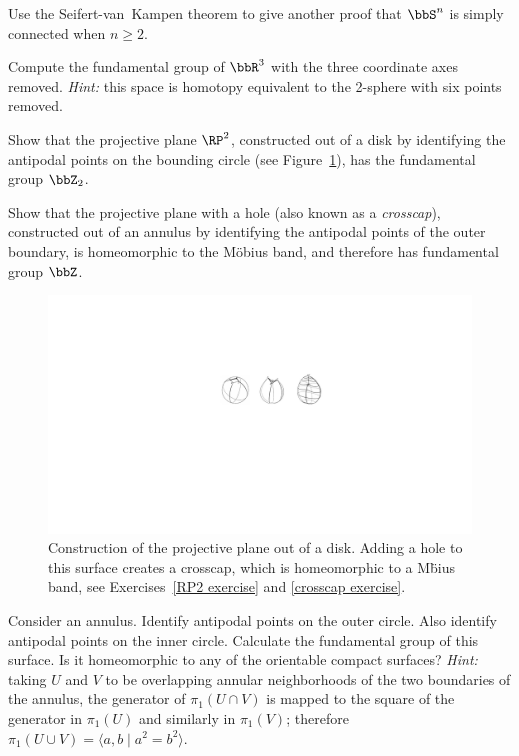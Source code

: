 \begin{xca}{{{\cite[Exercise 10-1]{LeeTop}}}}
    Use the Seifert-van~Kampen theorem to give another proof that $\bbS^n$ is simply connected when $n \geq 2$.
\end{xca}
\begin{xca}{{{\cite[Excercise 10-5]{LeeTop}}}}
    Compute the fundamental group of $\bbR^3$ with the three coordinate axes removed. \emph{Hint:} this space is homotopy equivalent to the 2-sphere with six points removed.
\end{xca}
\begin{xca}\label{RP2 exercise}
    Show that the projective plane $\RP^2$, constructed out of a disk by identifying the antipodal points on the bounding circle (see Figure~\ref{fig:crosscap}), has the fundamental group $\bbZ_2$.
\end{xca}
\begin{xca}[Crosscap]\label{crosscap exercise}
    Show that the projective plane with a hole (also known as a \emph{crosscap}), constructed out of an annulus by identifying the antipodal points of the outer boundary, is homeomorphic to the M\"obius band, and therefore has fundamental group $\bbZ$.
\end{xca}
\begin{figure}[tp]
    \centering
    \includegraphics[scale=0.6]{figures/crosscap.pdf}
    \caption{Construction of the projective plane out of a disk. Adding a hole to this surface creates a crosscap, which is homeomorphic to a M\"bius band, see Exercises~\ref{RP2 exercise} and \ref{crosscap exercise}.}
    \label{fig:crosscap}
\end{figure}
\begin{example}{{{\cite[Exercise III.3]{Bredon}}}}
    Consider an annulus. Identify antipodal points on the outer circle. Also identify antipodal points on the inner circle. Calculate the fundamental group of this surface. Is it homeomorphic to any of the orientable compact surfaces? \emph{Hint:} taking $U$ and $V$ to be overlapping annular neighborhoods of the two boundaries of the annulus, the generator of $\pi_1(U\cap V)$ is mapped to the square of the generator in $\pi_1(U)$ and similarly in $\pi_1(V)$; therefore $\pi_1(U\cup V)=\langle a,b\mid a^2=b^2\rangle$.
\end{example}
